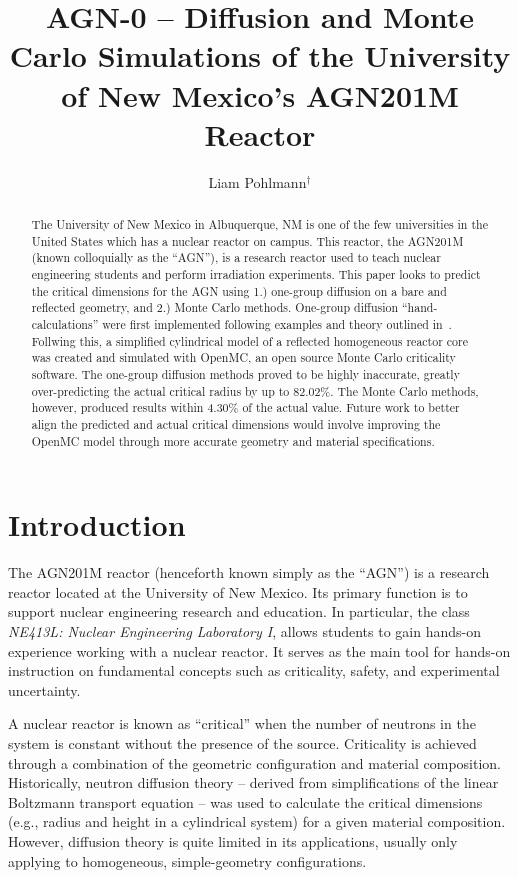 \documentclass{anstrans}
\title{\Large AGN-0 -- Diffusion and Monte Carlo Simulations of the University of New Mexico's AGN201M Reactor}\vspace{0.5cm}
\author{Liam Pohlmann$^{\dagger}$}
\institute{
    $^{\dagger}$Undergraduate, Department of Nuclear Engineering, University of New Mexico, Albuquerque, NM
}
\begin{document}
    \singlespace


    \begin{abstract}
        The University of New Mexico in Albuquerque, NM is one of the few universities in the United States which has a nuclear reactor on campus.
        This reactor, the AGN201M (known colloquially as the ``AGN''), is a research reactor used to teach nuclear engineering students and perform irradiation experiments.
        This paper looks to predict the critical dimensions for the AGN using 1.) one-group diffusion on a bare and reflected geometry, and 2.) Monte Carlo methods.
        One-group diffusion ``hand-calculations'' were first implemented following examples and theory outlined in~\cite{buschAnalyticalCalculationsAGN, bowenHandCalculationMethods2023, lamarshIntroductionNuclearEngineering2001}.
        Follwing this, a simplified cylindrical model of a reflected homogeneous reactor core was created and simulated with OpenMC, an open source Monte Carlo criticality software.
        The one-group diffusion methods proved to be highly inaccurate, greatly over-predicting the actual critical radius by up to 82.02\%.
        The Monte Carlo methods, however, produced results within 4.30\% of the actual value.
        Future work to better align the predicted and actual critical dimensions would involve improving the OpenMC model through more accurate geometry and material specifications.
    \end{abstract}
    \section{Introduction}
    The AGN201M reactor (henceforth known simply as the ``AGN'') is a research reactor located at the University of New Mexico.
    Its primary function is to support nuclear engineering research and education.
    In particular, the class \textit{NE413L: Nuclear Engineering Laboratory I}, allows students to gain hands-on experience working with a nuclear reactor.
    It serves as the main tool for hands-on instruction on fundamental concepts such as criticality, safety, and experimental uncertainty.

    A nuclear reactor is known as ``critical'' when the number of neutrons in the system is constant without the presence of the source.
    Criticality is achieved through a combination of the geometric configuration and material composition.
    Historically, neutron diffusion theory -- derived from simplifications of the linear Boltzmann transport equation -- was used to calculate the critical dimensions (e.g., radius and height in a cylindrical system) for a given material composition.
    However, diffusion theory is quite limited in its applications, usually only applying to homogeneous, simple-geometry configurations.
\end{document}
